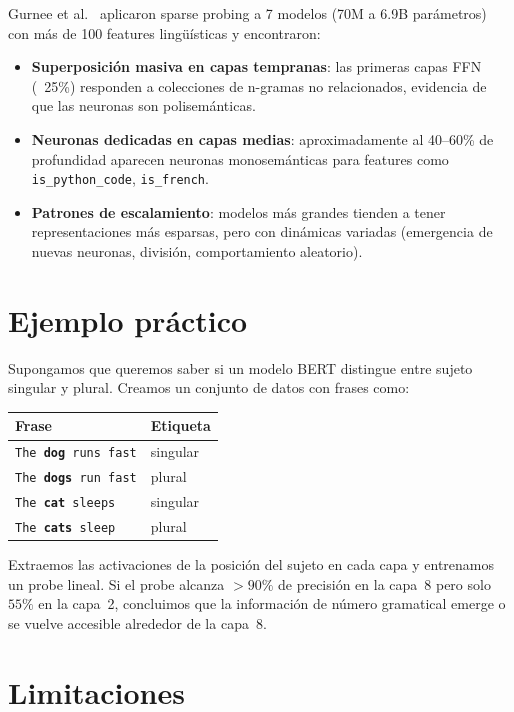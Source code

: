 \documentclass[11pt,a4paper]{report}
\theoremstyle{definition}
\begin{document}
Gurnee et al.~\cite{gurnee2023sparseprobing} aplicaron sparse probing a 7 modelos (70M a 6.9B parámetros) con más de 100 features lingüísticas y encontraron:

\begin{itemize}
    \item \textbf{Superposición masiva en capas tempranas}: las primeras capas FFN (~25\%) responden a colecciones de n-gramas no relacionados, evidencia de que las neuronas son polisemánticas.
    \item \textbf{Neuronas dedicadas en capas medias}: aproximadamente al 40--60\% de profundidad aparecen neuronas monosemánticas para features como \texttt{is\_python\_code}, \texttt{is\_french}.
    \item \textbf{Patrones de escalamiento}: modelos más grandes tienden a tener representaciones más esparsas, pero con dinámicas variadas (emergencia de nuevas neuronas, división, comportamiento aleatorio).
\end{itemize}

\section{Ejemplo práctico}

Supongamos que queremos saber si un modelo BERT distingue entre sujeto singular y plural. Creamos un conjunto de datos con frases como:

\begin{center}
\begin{tabular}{ll}
\toprule
\textbf{Frase} & \textbf{Etiqueta} \\
\midrule
\texttt{The \textbf{dog} runs fast} & singular \\
\texttt{The \textbf{dogs} run fast} & plural \\
\texttt{The \textbf{cat} sleeps} & singular \\
\texttt{The \textbf{cats} sleep} & plural \\
\bottomrule
\end{tabular}
\end{center}

Extraemos las activaciones de la posición del sujeto en cada capa y entrenamos un probe lineal. Si el probe alcanza $>90\%$ de precisión en la capa~8 pero solo $55\%$ en la capa~2, concluimos que la información de número gramatical emerge o se vuelve accesible alrededor de la capa~8.

\section{Limitaciones}
\end{document}
